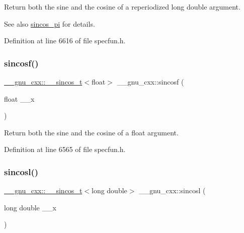 Return both the sine and the cosine of a reperiodized {\ttfamily  long double } argument.

\begin{DoxySeeAlso}{See also}
\hyperlink{group__mathsf__gnu_ga6553883f127ea0de67041c3128e03813}{sincos\+\_\+pi} for details. 
\end{DoxySeeAlso}


Definition at line 6616 of file specfun.\+h.

\mbox{\label{group__mathsf__gnu_ga3929d13e38535418cd24db5cee80660c}} 
\subsubsection{\texorpdfstring{sincosf()}{sincosf()}}
{\footnotesize\ttfamily \hyperlink{struct____gnu__cxx_1_1____sincos__t}{\+\_\+\+\_\+gnu\+\_\+cxx\+::\+\_\+\+\_\+sincos\+\_\+t}$<$float$>$ \+\_\+\+\_\+gnu\+\_\+cxx\+::sincosf (\begin{DoxyParamCaption}\item[{float}]{\+\_\+\+\_\+x }\end{DoxyParamCaption})\hspace{0.3cm}{\ttfamily [inline]}}

Return both the sine and the cosine of a {\ttfamily float} argument. 

Definition at line 6565 of file specfun.\+h.

\mbox{\label{group__mathsf__gnu_ga96a7222e47d430a228973658ca9f6f35}} 
\subsubsection{\texorpdfstring{sincosl()}{sincosl()}}
{\footnotesize\ttfamily \hyperlink{struct____gnu__cxx_1_1____sincos__t}{\+\_\+\+\_\+gnu\+\_\+cxx\+::\+\_\+\+\_\+sincos\+\_\+t}$<$long double$>$ \+\_\+\+\_\+gnu\+\_\+cxx\+::sincosl (\begin{DoxyParamCaption}\item[{long double}]{\+\_\+\+\_\+x }\end{DoxyParamCaption})\hspace{0.3cm}{\ttfamily [inline]}}

